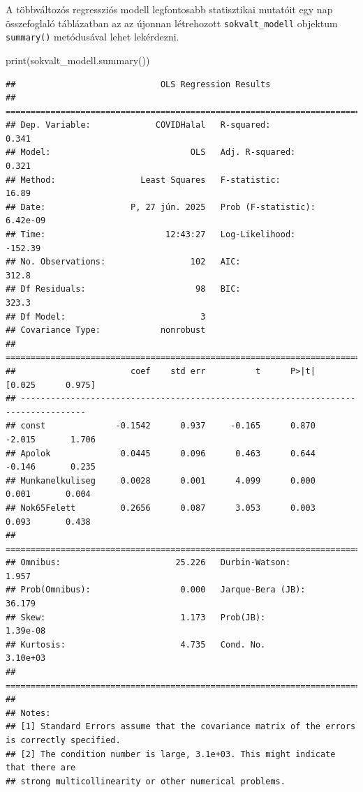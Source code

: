 \documentclass[
]{book}
\newenvironment{Shaded}{\begin{snugshade}}{\end{snugshade}}
\newcommand{\BuiltInTok}[1]{#1}
\newcommand{\NormalTok}[1]{#1}
\begin{document}
A többváltozós regressziós modell legfontosabb statisztikai mutatóit egy nap összefoglaló táblázatban az az újonnan létrehozott \texttt{sokvalt\_modell} objektum \texttt{summary()} metódusával lehet lekérdezni.

\begin{Shaded}
\begin{Highlighting}[]
\BuiltInTok{print}\NormalTok{(sokvalt\_modell.summary())}
\end{Highlighting}
\end{Shaded}

\begin{verbatim}
##                             OLS Regression Results                            
## ==============================================================================
## Dep. Variable:             COVIDHalal   R-squared:                       0.341
## Model:                            OLS   Adj. R-squared:                  0.321
## Method:                 Least Squares   F-statistic:                     16.89
## Date:                 P, 27 jún. 2025   Prob (F-statistic):           6.42e-09
## Time:                        12:43:27   Log-Likelihood:                -152.39
## No. Observations:                 102   AIC:                             312.8
## Df Residuals:                      98   BIC:                             323.3
## Df Model:                           3                                         
## Covariance Type:            nonrobust                                         
## ===================================================================================
##                       coef    std err          t      P>|t|      [0.025      0.975]
## -----------------------------------------------------------------------------------
## const              -0.1542      0.937     -0.165      0.870      -2.015       1.706
## Apolok              0.0445      0.096      0.463      0.644      -0.146       0.235
## Munkanelkuliseg     0.0028      0.001      4.099      0.000       0.001       0.004
## Nok65Felett         0.2656      0.087      3.053      0.003       0.093       0.438
## ==============================================================================
## Omnibus:                       25.226   Durbin-Watson:                   1.957
## Prob(Omnibus):                  0.000   Jarque-Bera (JB):               36.179
## Skew:                           1.173   Prob(JB):                     1.39e-08
## Kurtosis:                       4.735   Cond. No.                     3.10e+03
## ==============================================================================
## 
## Notes:
## [1] Standard Errors assume that the covariance matrix of the errors is correctly specified.
## [2] The condition number is large, 3.1e+03. This might indicate that there are
## strong multicollinearity or other numerical problems.
\end{verbatim}
\end{document}
